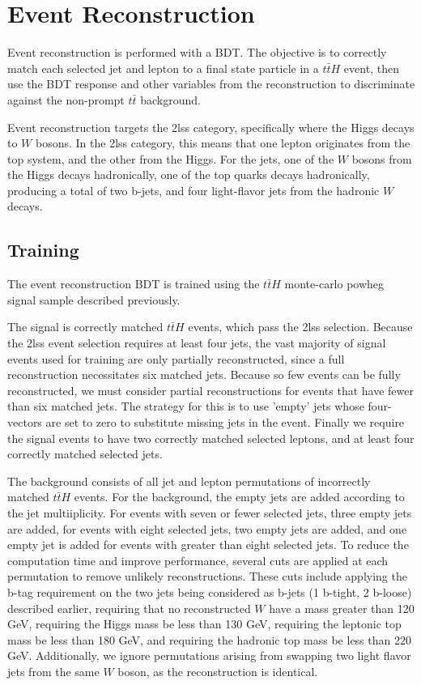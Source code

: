\section{Event Reconstruction}

Event reconstruction is performed with a BDT. The objective is to correctly match
each selected jet and lepton to a final state particle in a $t\bar{t}H$ event, then
use the BDT response and other variables from the reconstruction to discriminate
against the non-prompt $t\bar{t}$ background.     

Event reconstruction targets the 2lss category, specifically where the Higgs decays
to $W$ bosons. In the 2lss category, this means that one lepton originates from the
top system, and the other from the Higgs. For the jets, one of the
$W$ bosons from the Higgs decays hadronically, one of the top quarks decays
hadronically, producing a total of two b-jets, and four light-flavor jets
from the hadronic $W$ decays.   

\subsection{Training}

The event reconstruction BDT is trained using the $t\bar{t}H$ monte-carlo powheg
signal sample described previously. 

The signal is correctly matched $t\bar{t}H$ events, which pass the 2lss selection.
Because the 2lss event selection requires at least four jets, the vast majority of signal
events used for training are only partially reconstructed, since a full reconstruction
necessitates six matched jets. Because so few events can be fully reconstructed, we must
consider partial reconstructions for events that have fewer than six matched jets.
The strategy for this is to use 'empty' jets whose four-vectors are set to zero to
substitute missing jets in the event. Finally we require the signal events to have two
correctly matched selected leptons, and at least four correctly matched selected jets.

The background consists of all jet and lepton permutations of incorrectly matched
$t\bar{t}H$ events. For the background, the empty jets are added according to the
jet multiiplicity. For events with seven or fewer selected jets, three empty jets are
added, for events with eight selected jets, two empty jets are added, and one empty jet
is added for events with greater than eight selected jets. To reduce the computation
time and improve performance,
several cuts are applied at each permutation to remove unlikely reconstructions.
These cuts include applying the b-tag requirement on the two jets being considered
as b-jets (1 b-tight, 2 b-loose) described earlier, requiring that no
reconstructed $W$ have a mass greater than 120 GeV, requiring the Higgs mass be less
than 130 GeV, requiring the leptonic top mass be less than 180 GeV, and requiring 
the hadronic top mass be less than 220 GeV. Additionally, we ignore permutations
arising from swapping two light flavor jets from the same $W$ boson, as the reconstruction is
identical. 

